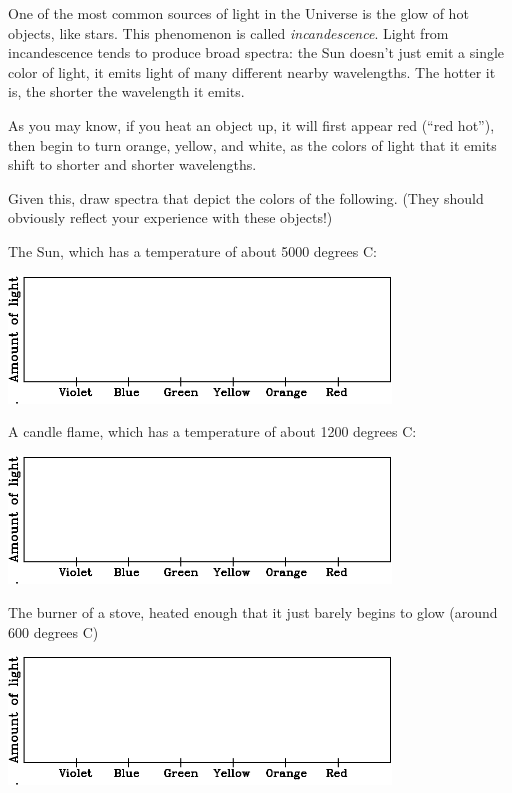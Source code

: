 \documentclass[11pt]{article}
\begin{document}
One of the most common sources of light in the Universe is the glow of hot objects, like stars. This phenomenon is called {\it incandescence}. 
Light from incandescence tends to produce broad spectra: the Sun doesn't just emit a single color of light, it emits light of many different 
nearby wavelengths. The hotter it is, the shorter the wavelength it emits.

As you may know, if you heat an object up, it will first appear red (``red hot''), then begin to turn orange, yellow, and white, as the colors of light 
that it emits shift to shorter and shorter wavelengths.

Given this, draw spectra that depict the colors of the following. (They should obviously reflect your experience with these objects!)

\begin{center}

\large

The Sun, which has a temperature of about 5000 degrees C:

\includegraphics[width=4in]{blank-spectrum-crop.pdf}

\bigskip

A candle flame, which has a temperature of about 1200 degrees C:

\includegraphics[width=4in]{blank-spectrum-crop.pdf}
\bigskip

The burner of a stove, heated enough that it just barely begins to glow (around 600 degrees C)

\includegraphics[width=4in]{blank-spectrum-crop.pdf}
\bigskip

\end{center}
\end{document}
